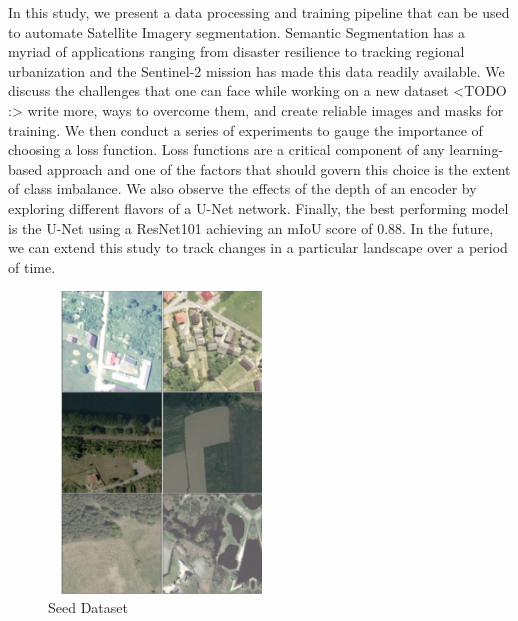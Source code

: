 \documentclass[conference]{IEEEtran}
\begin{document}
In this study, we present a data processing and training pipeline that can be used to automate Satellite Imagery segmentation. Semantic Segmentation has a myriad of applications ranging from disaster resilience to tracking regional urbanization and the Sentinel-2 mission has made this data readily available. We discuss the challenges that one can face while working on a new dataset <TODO :> write more, ways to overcome them, and create reliable images and masks for training. We then conduct a series of experiments to gauge the importance of choosing a loss function. Loss functions are a critical component of any learning-based approach and one of the factors that should govern this choice is the extent of class imbalance. We also observe the effects of the depth of an encoder by exploring different flavors of a U-Net network. Finally, the best performing model is the U-Net using a ResNet101 achieving an mIoU score of 0.88. In the future, we can extend this study to track changes in a particular landscape over a period of time.



\begin{figure}[h]
    \includegraphics[width=6cm, height=8cm]{images/dataset-vis.png}
    \caption{Seed Dataset}
\end{figure}



\newpage
\printbibliography %
\end{document}

